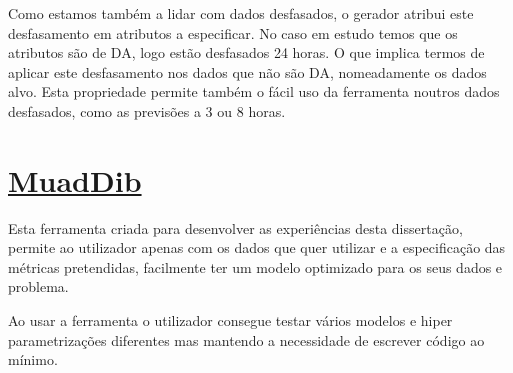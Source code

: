 Como estamos também a lidar com dados desfasados, o gerador atribui este desfasamento em atributos a especificar. No caso em estudo temos que os atributos são de \gls{DA}, logo estão desfasados 24 horas. O que implica termos de aplicar este desfasamento nos dados que não são \gls{DA}, nomeadamente os dados alvo. Esta propriedade permite também o fácil uso da ferramenta noutros dados desfasados, como as previsões a 3 ou 8 horas.\par

\section{\href{https://github.com/alquimodelia/MuadDib}{MuadDib}\label{se:muaddib}}

Esta ferramenta criada para desenvolver as experiências desta dissertação, permite ao utilizador apenas com os dados que quer utilizar e a especificação das métricas pretendidas, facilmente ter um modelo optimizado para os seus dados e problema.\par
Ao usar a ferramenta o utilizador consegue testar vários modelos e hiper parametrizações diferentes mas mantendo a necessidade de escrever código ao mínimo.\par
